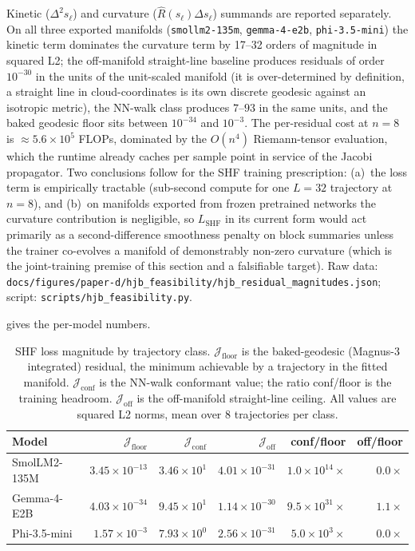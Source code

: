 \documentclass[11pt]{article}
\begin{document}
Kinetic ($\Delta^2 s_\ell$) and curvature
($\hat R(s_\ell)\Delta s_\ell$) summands are reported separately. On
all three exported manifolds (\texttt{smollm2-135m},
\texttt{gemma-4-e2b}, \texttt{phi-3.5-mini}) the kinetic term dominates
the curvature term by 17--32 orders of magnitude in squared L2; the
off-manifold straight-line baseline produces residuals of order
$10^{-30}$ in the units of the unit-scaled manifold (it is
over-determined by definition, a straight line in cloud-coordinates
is its own discrete geodesic against an isotropic metric), the
NN-walk class produces $7$--$93$ in the same units, and the baked
geodesic floor sits between $10^{-34}$ and $10^{-3}$. The per-residual
cost at $n{=}8$ is $\approx\!5.6\!\times\!10^{5}$ FLOPs, dominated by
the $O(n^4)$ Riemann-tensor evaluation, which the runtime already
caches per sample point in service of the Jacobi propagator.
Two conclusions follow for the SHF training prescription:
(a)~the loss term is empirically tractable (sub-second compute for one
$L{=}32$ trajectory at $n{=}8$), and
(b)~on manifolds exported from frozen pretrained networks the
curvature contribution is negligible, so $L_\text{SHF}$ in its current
form would act primarily as a second-difference smoothness penalty
on block summaries unless the trainer co-evolves a manifold of
demonstrably non-zero curvature (which is the joint-training premise
of this section and a falsifiable target). Raw data:
\texttt{docs/figures/paper-d/hjb\_feasibility/hjb\_residual\_magnitudes.json};
script: \texttt{scripts/hjb\_feasibility.py}.

 gives the per-model numbers.

\begin{table}[h]\centering\small
\caption{SHF loss magnitude by trajectory class.
$\mathcal{J}_\text{floor}$ is the baked-geodesic (Magnus-3 integrated)
residual, the minimum achievable by a trajectory in the fitted manifold.
$\mathcal{J}_\text{conf}$ is the NN-walk conformant value; the ratio
conf/floor is the training headroom.
$\mathcal{J}_\text{off}$ is the off-manifold straight-line ceiling.
All values are squared L2 norms, mean over 8 trajectories per class.}
\label{tab:hjb-feasibility}
\begin{tabular}{@{}lrrrrr@{}}
\toprule
Model & $\mathcal{J}_\text{floor}$ & $\mathcal{J}_\text{conf}$ &
  $\mathcal{J}_\text{off}$ & conf/floor & off/floor \\
\midrule
SmolLM2-135M  & $3.45 \times 10^{-13}$ & $3.46 \times 10^{1}$ &
  $4.01 \times 10^{-31}$ & $1.0 \times 10^{14}\times$ & $0.0\times$ \\
Gemma-4-E2B   & $4.03 \times 10^{-34}$ & $9.45 \times 10^{1}$ &
  $1.14 \times 10^{-30}$ & $9.5 \times 10^{31}\times$ & $1.1\times$ \\
Phi-3.5-mini  & $1.57 \times 10^{-3}$  & $7.93 \times 10^{0}$  &
  $2.56 \times 10^{-31}$ & $5.0 \times 10^{3}\times$  & $0.0\times$ \\
\bottomrule
\end{tabular}
\end{table}
\end{document}
